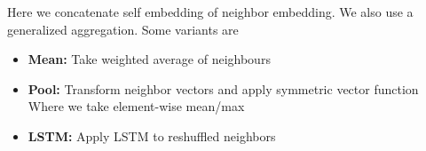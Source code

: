     Here we concatenate self embedding of neighbor embedding. We also use a generalized aggregation. Some variants are
    \begin{itemize}
        \item \textbf{Mean:} Take weighted average of neighbours 
        \item \textbf{Pool:} Transform neighbor vectors and apply symmetric vector function 
        Where we take element-wise mean/max
    \item \textbf{LSTM:} Apply LSTM to reshuffled neighbors 
    \end{itemize}